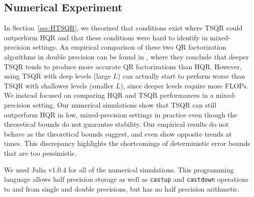 \documentclass[review,onefignum,onetabnum]{siamart190516}
\newcommand{\bb}[1]{\mathbf{#1}}
\begin{document}
\subsection{Numerical Experiment}
\label{sec:NE}
In Section~\ref{sec:HTSQR}, we theorized that conditions exist where TSQR could outperform HQR and that these conditions were hard to identify in mixed-precision settings. 
An empirical comparison of these two QR factorization algorithms in double precision can be found in \cite{Mori2012}, where they conclude that deeper TSQR tends to produce more accurate QR factorizations than HQR.
However, using TSQR with deep levels (large $L$) can actually start to perform worse than TSQR with shallower levels (smaller $L$), since deeper levels require more FLOPs.
We instead focused on comparing HQR and TSQR performances in a mixed-precision setting.
Our numerical simulations show that TSQR can still outperform HQR in low, mixed-precision settings in practice even though the theoretical bounds do not guarantee stability.
Our empirical results do not behave as the theoretical bounds suggest, and even show opposite trends at times. 
This discrepancy highlights the shortcomings of deterministic error bounds that are too pessimistic. \par
We used Julia v1.0.4 for all of the numerical simulations. 
This programming language allows half precision storage as well as {\tt castup} and {\tt castdown} operations to and from single and double precisions, but has no half precision arithmetic.
\end{document}
